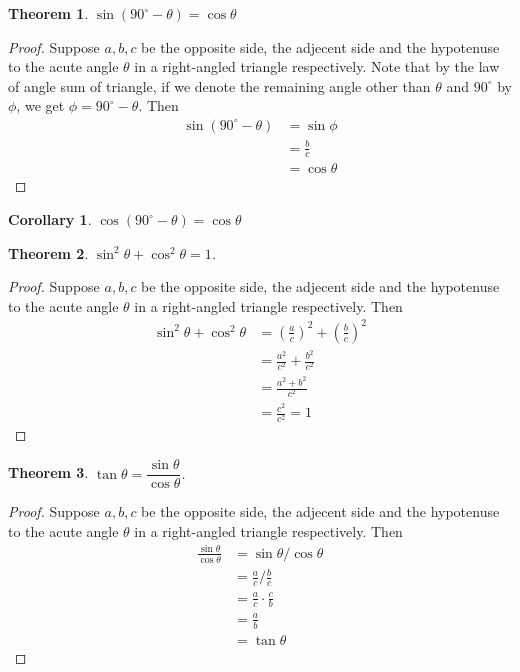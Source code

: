 \documentclass[12pt]{article}
\newtheorem*{theorem}{Theorem}
\newtheorem*{corollary}{Corollary}
\begin{document}
    \begin{theorem}
        $\sin(90^\circ - \theta)=\cos{\theta}$
    \end{theorem}

    \begin{proof}
        Suppose $a,b,c$ be the opposite side, the adjecent side and the hypotenuse to the acute angle $\theta$ in a right-angled triangle respectively. Note that by the law of angle sum of triangle, if we denote the remaining angle other than $\theta$ and $90^\circ$ by $\phi$, we get $\phi = 90^\circ - \theta$. Then \begin{align*}
            \sin(90^\circ - \theta) &= \sin{\phi}\\
            &= \frac{b}{c}\\
            &= \cos{\theta}
        \end{align*}
    \end{proof}

    \begin{corollary}
        $\cos(90^\circ - \theta)=\cos{\theta}$
    \end{corollary}

    \begin{theorem}
        $\sin^2{\theta}+\cos^2{\theta}=1$.
    \end{theorem}

    \begin{proof}
        Suppose $a,b,c$ be the opposite side, the adjecent side and the hypotenuse to the acute angle $\theta$ in a right-angled triangle respectively. Then \begin{align*}
            \sin^2{\theta}+\cos^2{\theta}&=(\frac{a}{c})^2+(\frac{b}{c})^2\\
            &=\frac{a^2}{c^2}+\frac{b^2}{c^2}\\
            &=\frac{a^2+b^2}{c^2}\\
            &=\frac{c^2}{c^2}=1
        \end{align*}
    \end{proof}

    \begin{theorem}
        $\tan{\theta}=\dfrac{\sin{\theta}}{\cos{\theta}}$.
    \end{theorem}

    \begin{proof}
        Suppose $a,b,c$ be the opposite side, the adjecent side and the hypotenuse to the acute angle $\theta$ in a right-angled triangle respectively. Then \begin{align*}
            \frac{\sin{\theta}}{\cos{\theta}}&=\sin{\theta}/ \cos{\theta}\\
            &=\frac{a}{c}/ \frac{b}{c}\\
            &=\frac{a}{c}\cdot \frac{c}{b}\\
            &=\frac{a}{b}\\
            &=\tan{\theta}
        \end{align*}
    \end{proof}
\end{document}
